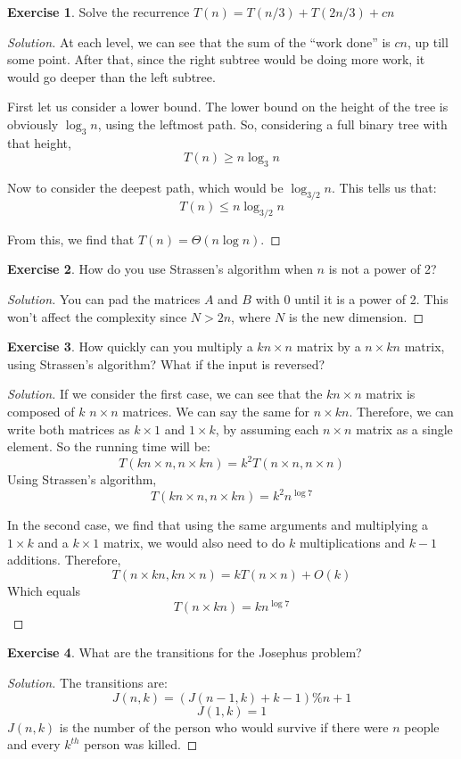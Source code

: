 \documentclass[12pt,letterpaper]{article}
\theoremstyle{definition}
\newtheorem*{exercise}{Exercise}
\newenvironment{solution}
  {\renewcommand\qedsymbol{$\blacksquare$}\begin{proof}[Solution]}
  {\end{proof}}
\begin{document}
\begin{exercise}
  Solve the recurrence $T(n) = T(n/3) + T(2n/3) + cn$
\end{exercise}
\begin{solution}
  At each level, we can see that the sum of the ``work done''  is $cn$, up till some point. After that, since the right subtree would be doing more work, it would go deeper than the left subtree.

  First let us consider a lower bound. The lower bound on the height of the tree is obviously $\log_3n$, using the leftmost path. So, considering a full binary tree with that height,
  \[T(n) \geq n \log_3n\]

  Now to consider the deepest path, which would be $\log_{3/2}n$. This tells us that:
  \[T(n) \leq n \log_{3/2}n\]

  From this, we find that $T(n) = \Theta(n \log n)$.
\end{solution}

\begin{exercise}
  How do you use Strassen's algorithm when $n$ is not a power of 2?
\end{exercise}
\begin{solution}
  You can pad the matrices $A$ and $B$ with 0 until it is a power of 2. This won't affect the complexity since $N > 2n$, where $N$ is the new dimension.
\end{solution}

\begin{exercise}
  How quickly can you multiply a $kn \times n$ matrix by a $n \times kn$ matrix, using Strassen's algorithm? What if the input is reversed?
\end{exercise}
\begin{solution}
  If we consider the first case, we can see that the $kn \times n$ matrix is composed of $k$ $n \times n$ matrices. We can say the same for $n \times kn$. Therefore, we can write both matrices as $k \times 1$ and $1 \times k$, by assuming each $n \times n$ matrix as a single element. So the running time will be:
  \[T(kn \times n, n \times kn) = k^2 T(n \times n, n \times n)\]
Using Strassen's algorithm,
\[T(kn \times n, n \times kn) = k^2 n^{\log 7}\]

In the second case, we find that using the same arguments and multiplying a $1 \times k$ and a $k \times 1$ matrix, we would also need to do $k$ multiplications and $k-1$ additions. Therefore,
\[T(n \times kn, kn \times n) = kT(n \times n) + O(k)\]
Which equals
\[T(n \times kn) = k n^{\log 7}\]
\end{solution}

\begin{exercise}
  What are the transitions for the Josephus problem?
\end{exercise}
\begin{solution}
  The transitions are:
  \[J(n,k) = (J(n-1,k) + k - 1)\%n + 1\]
  \[J(1,k) = 1\]
  $J(n,k)$ is the number of the person who would survive if there were $n$ people and every $k^{th}$ person was killed.
\end{solution}
\end{document}
